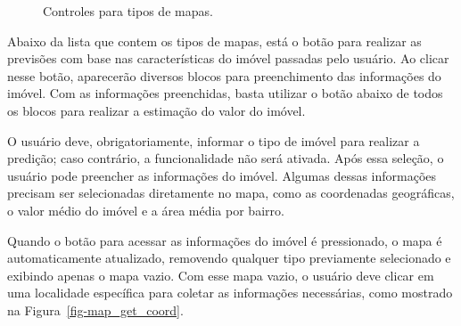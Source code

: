 \documentclass[
  12pt,
  a4paper,
]{scrreprt}
\begin{document}
\begin{figure}


\caption{\label{fig-menu_map}Controles para tipos de mapas.}

\end{figure}%

Abaixo da lista que contem os tipos de mapas, está o botão para realizar
as previsões com base nas características do imóvel passadas pelo
usuário. Ao clicar nesse botão, aparecerão diversos blocos para
preenchimento das informações do imóvel. Com as informações preenchidas,
basta utilizar o botão abaixo de todos os blocos para realizar a
estimação do valor do imóvel.

\vspace{12pt}

O usuário deve, obrigatoriamente, informar o tipo de imóvel para
realizar a predição; caso contrário, a funcionalidade não será ativada.
Após essa seleção, o usuário pode preencher as informações do imóvel.
Algumas dessas informações precisam ser selecionadas diretamente no
mapa, como as coordenadas geográficas, o valor médio do imóvel e a área
média por bairro.

\vspace{12pt}

Quando o botão para acessar as informações do imóvel é pressionado, o
mapa é automaticamente atualizado, removendo qualquer tipo previamente
selecionado e exibindo apenas o mapa vazio. Com esse mapa vazio, o
usuário deve clicar em uma localidade específica para coletar as
informações necessárias, como mostrado na
Figura~\ref{fig-map_get_coord}.
\end{document}
